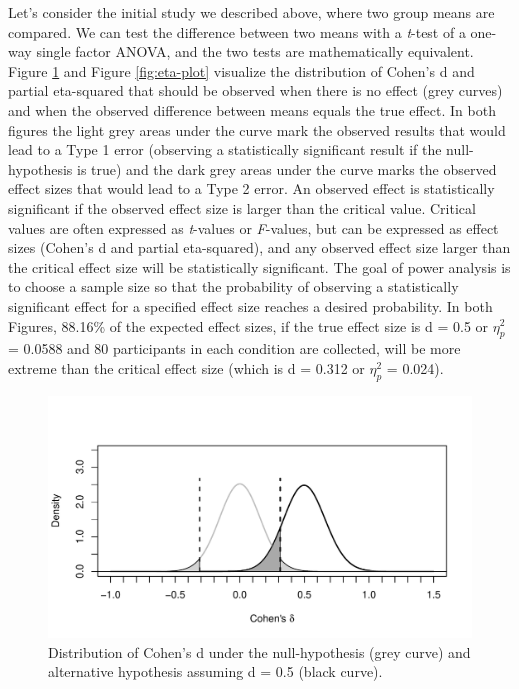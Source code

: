 \documentclass[,man,floatsintext]{apa6}
\begin{document}
Let's consider the initial study we described above, where two group
means are compared. We can test the difference between two means with a
\emph{t}-test of a one-way single factor ANOVA, and the two tests are
mathematically equivalent. Figure \ref{fig:d-plot} and Figure
\ref{fig:eta-plot} visualize the distribution of Cohen's d and partial
eta-squared that should be observed when there is no effect (grey
curves) and when the observed difference between means equals the true
effect. In both figures the light grey areas under the curve mark the
observed results that would lead to a Type 1 error (observing a
statistically significant result if the null-hypothesis is true) and the
dark grey areas under the curve marks the observed effect sizes that
would lead to a Type 2 error. An observed effect is statistically
significant if the observed effect size is larger than the critical
value. Critical values are often expressed as \emph{t}-values or
\emph{F}-values, but can be expressed as effect sizes (Cohen's d and
partial eta-squared), and any observed effect size larger than the
critical effect size will be statistically significant. The goal of
power analysis is to choose a sample size so that the probability of
observing a statistically significant effect for a specified effect size
reaches a desired probability. In both Figures, 88.16\% of the expected
effect sizes, if the true effect size is d = 0.5 or \(\eta_p^2\) =
0.0588 and 80 participants in each condition are collected, will be more
extreme than the critical effect size (which is d = 0.312 or
\(\eta_p^2\) = 0.024).

\begin{figure}
\centering
\includegraphics{0.1_Simulation_Based_Power_Analysis_For_Factorial_ANOVA_Designs_files/figure-latex/d-plot-1.pdf}
\caption{\label{fig:d-plot}Distribution of Cohen's d under the
null-hypothesis (grey curve) and alternative hypothesis assuming d = 0.5
(black curve).}
\end{figure}
\end{document}
